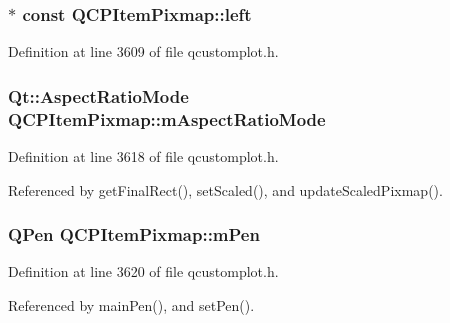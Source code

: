 \subsubsection[{left}]{$\ast$ const Q\+C\+P\+Item\+Pixmap\+::left}\label{class_q_c_p_item_pixmap_a8c85fcb8cb8ce292859a0499d16539b1}


Definition at line 3609 of file qcustomplot.\+h.

\hypertarget{class_q_c_p_item_pixmap_a8dc6b6c1e106ac523efae22d5fe55bab}{}
\subsubsection[{m\+Aspect\+Ratio\+Mode}]{\setlength{\rightskip}{0pt plus 5cm}Qt\+::\+Aspect\+Ratio\+Mode Q\+C\+P\+Item\+Pixmap\+::m\+Aspect\+Ratio\+Mode\hspace{0.3cm}{\ttfamily [protected]}}\label{class_q_c_p_item_pixmap_a8dc6b6c1e106ac523efae22d5fe55bab}


Definition at line 3618 of file qcustomplot.\+h.



Referenced by get\+Final\+Rect(), set\+Scaled(), and update\+Scaled\+Pixmap().

\hypertarget{class_q_c_p_item_pixmap_acfee1124eb51a1887aaf8de10777c7a1}{}
\subsubsection[{m\+Pen}]{\setlength{\rightskip}{0pt plus 5cm}Q\+Pen Q\+C\+P\+Item\+Pixmap\+::m\+Pen\hspace{0.3cm}{\ttfamily [protected]}}\label{class_q_c_p_item_pixmap_acfee1124eb51a1887aaf8de10777c7a1}


Definition at line 3620 of file qcustomplot.\+h.



Referenced by main\+Pen(), and set\+Pen().

\hypertarget{class_q_c_p_item_pixmap_a1396cce7f26c7b8e9512906284380c4d}{}
